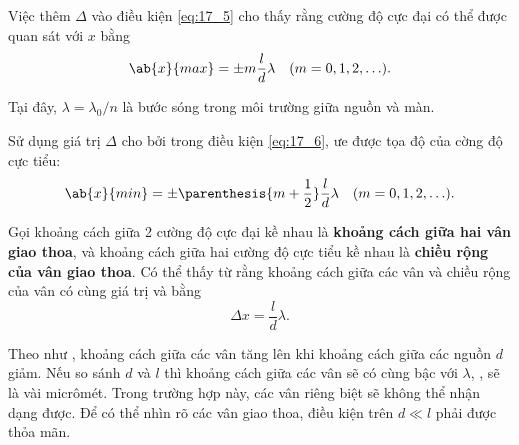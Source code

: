 \noindent
Việc thêm $\Delta$ vào điều kiện \eqref{eq:17_5} cho thấy rằng cường độ cực đại có thể được quan sát với $x$ bằng 
\begin{equation}\label{eq:17_8}
    \ab{x}{max} = \pm m \frac{l}{d} \lambda \quad (m = 0, 1, 2, \ldots).
\end{equation}

\noindent
Tại đây, $\lambda=\lambda_0/n$ là bước sóng trong môi trường giữa nguồn và màn.

Sử dụng giá trị $\Delta$ cho bởi  trong điều kiện \eqref{eq:17_6}, ưe được tọa độ của cờng độ cực tiểu:
\begin{equation}\label{eq:17_9}
    \ab{x}{min} = \pm \parenthesis{m + \frac{1}{2}} \frac{l}{d} \lambda \quad (m = 0, 1, 2, \ldots).
\end{equation}

Gọi khoảng cách giữa 2 cường độ cực đại kề nhau là \textbf{khoảng cách giữa hai vân giao thoa}, và khoảng cách giữa hai cường độ cực tiểu kề nhau là \textbf{chiều rộng của vân giao thoa}.
Có thể thấy từ  rằng khoảng cách giữa các vân và chiều rộng của vân có cùng giá trị và bằng 
\begin{equation}\label{eq:17_10}
    \Delta{x} = \frac{l}{d} \lambda.
\end{equation}

Theo như , khoảng cách giữa các vân tăng lên khi khoảng cách giữa các nguồn $d$ giảm.
Nếu so sánh $d$ và $l$ thì khoảng cách giữa các vân sẽ có cùng bậc với $\lambda$, \ie, sẽ là vài micrômét.
Trong trường hợp này, các vân riêng biệt sẽ không thể nhận dạng được.
Để có thể nhìn rõ các vân giao thoa, điều kiện trên $d\ll l$ phải được thỏa mãn.

